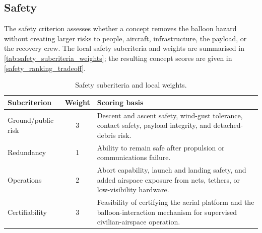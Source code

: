 \subsection{Safety}

The safety criterion assesses whether a concept removes the balloon
hazard without creating larger risks to people, aircraft,
infrastructure, the payload, or the recovery crew. The local safety
subcriteria and weights are summarised in \autoref{tab:safety_subcriteria_weights};
the resulting concept scores are given in \autoref{safety_ranking_tradeoff}.

\begin{table}[H]
\centering
\small
\caption{Safety subcriteria and local weights.}
\label{tab:safety_subcriteria_weights}
\begin{tabularx}{\textwidth}{p{} c X}
\toprule
\textbf{Subcriterion} & \textbf{Weight} & \textbf{Scoring basis} \\
\midrule
Ground/public risk & 3 & Descent and ascent safety, wind-gust tolerance, contact safety, payload integrity, and detached-debris risk. \\
Redundancy & 1 & Ability to remain safe after propulsion or communications failure. \\
Operations & 2 & Abort capability, launch and landing safety, and added airspace exposure from nets, tethers, or low-visibility hardware. \\
Certifiability & 3 & Feasibility of certifying the aerial platform and the balloon-interaction mechanism for supervised civilian-airspace operation. \\
\bottomrule
\end{tabularx}
\end{table}




